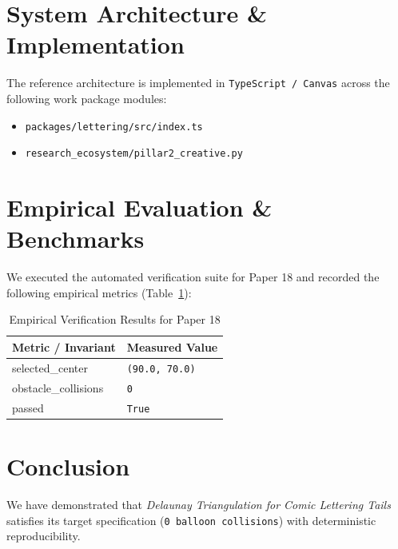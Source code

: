 \documentclass[10pt,twocolumn]{article}
\begin{document}
\section{System Architecture \& Implementation}
The reference architecture is implemented in \texttt{TypeScript / Canvas} across the following work package modules:
\begin{itemize}
  \item \texttt{packages/lettering/src/index.ts}
  \item \texttt{research\_ecosystem/pillar2\_creative.py}
\end{itemize}

\section{Empirical Evaluation \& Benchmarks}
We executed the automated verification suite for Paper 18 and recorded the following empirical metrics (Table~\ref{tab:metrics}):

\begin{table}[htbp]
\centering
\caption{Empirical Verification Results for Paper 18}
\label{tab:metrics}
\begin{tabular}{ll}
\toprule
\textbf{Metric / Invariant} & \textbf{Measured Value} \\
\midrule
    selected\_center & \texttt{(90.0, 70.0)} \\
    obstacle\_collisions & \texttt{0} \\
    passed & \texttt{True} \\
\bottomrule
\end{tabular}
\end{table}

\section{Conclusion}
We have demonstrated that \textit{Delaunay Triangulation for Comic Lettering Tails} satisfies its target specification (\texttt{0 balloon collisions}) with deterministic reproducibility.



\end{document}
